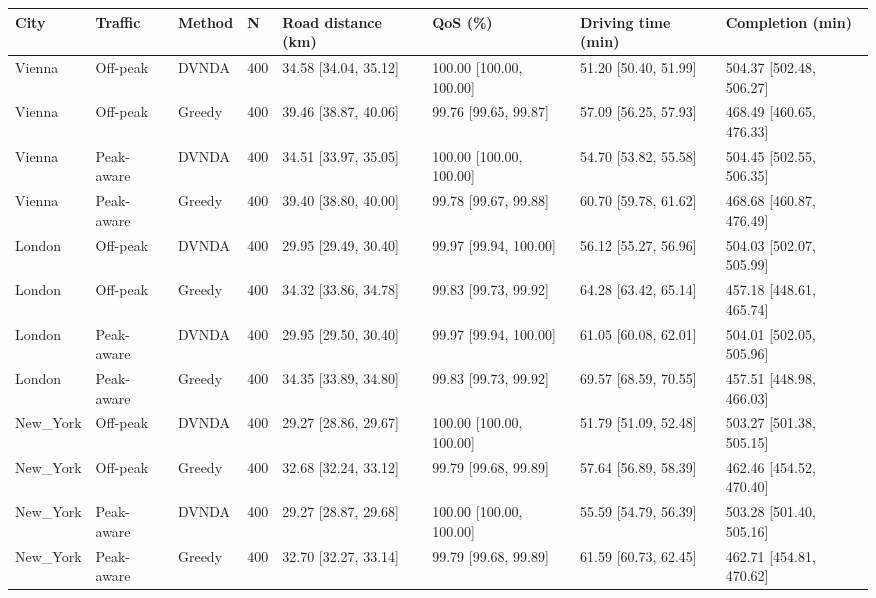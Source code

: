 \begin{tabular}{llllllll}
\hline
City & Traffic & Method & N & Road distance (km) & QoS (\%) & Driving time (min) & Completion (min) \\
\hline
Vienna & Off-peak & DVNDA & 400 & 34.58 [34.04, 35.12] & 100.00 [100.00, 100.00] & 51.20 [50.40, 51.99] & 504.37 [502.48, 506.27] \\
Vienna & Off-peak & Greedy & 400 & 39.46 [38.87, 40.06] & 99.76 [99.65, 99.87] & 57.09 [56.25, 57.93] & 468.49 [460.65, 476.33] \\
Vienna & Peak-aware & DVNDA & 400 & 34.51 [33.97, 35.05] & 100.00 [100.00, 100.00] & 54.70 [53.82, 55.58] & 504.45 [502.55, 506.35] \\
Vienna & Peak-aware & Greedy & 400 & 39.40 [38.80, 40.00] & 99.78 [99.67, 99.88] & 60.70 [59.78, 61.62] & 468.68 [460.87, 476.49] \\
London & Off-peak & DVNDA & 400 & 29.95 [29.49, 30.40] & 99.97 [99.94, 100.00] & 56.12 [55.27, 56.96] & 504.03 [502.07, 505.99] \\
London & Off-peak & Greedy & 400 & 34.32 [33.86, 34.78] & 99.83 [99.73, 99.92] & 64.28 [63.42, 65.14] & 457.18 [448.61, 465.74] \\
London & Peak-aware & DVNDA & 400 & 29.95 [29.50, 30.40] & 99.97 [99.94, 100.00] & 61.05 [60.08, 62.01] & 504.01 [502.05, 505.96] \\
London & Peak-aware & Greedy & 400 & 34.35 [33.89, 34.80] & 99.83 [99.73, 99.92] & 69.57 [68.59, 70.55] & 457.51 [448.98, 466.03] \\
New\_York & Off-peak & DVNDA & 400 & 29.27 [28.86, 29.67] & 100.00 [100.00, 100.00] & 51.79 [51.09, 52.48] & 503.27 [501.38, 505.15] \\
New\_York & Off-peak & Greedy & 400 & 32.68 [32.24, 33.12] & 99.79 [99.68, 99.89] & 57.64 [56.89, 58.39] & 462.46 [454.52, 470.40] \\
New\_York & Peak-aware & DVNDA & 400 & 29.27 [28.87, 29.68] & 100.00 [100.00, 100.00] & 55.59 [54.79, 56.39] & 503.28 [501.40, 505.16] \\
New\_York & Peak-aware & Greedy & 400 & 32.70 [32.27, 33.14] & 99.79 [99.68, 99.89] & 61.59 [60.73, 62.45] & 462.71 [454.81, 470.62] \\
\hline
\end{tabular}
